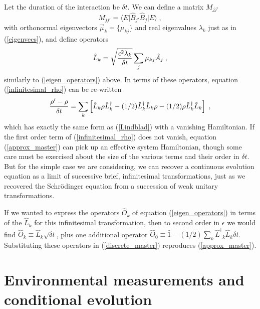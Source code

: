 \documentclass[12pt]{article}
\def\bra#1{{\langle #1 |}}
\def\ket#1{{| #1 \rangle}}
\def\id{{\hat 1}}
\def\O{{\hat O}}
\def\A{{\hat A}}
\def\B{{\hat B}}
\def\L{{\hat L}}
\def\Ldag{{\hat L^\dagger}}
\begin{document}
Let the duration of the interaction be $\delta t$.
We can define a matrix $M_{jj'}$
\begin{equation}
M_{jj'} = \bra{E}\B_{j'}\B_j\ket{E} \;,
\end{equation}
with orthonormal eigenvectors $\vec\mu_k = \{\mu_{kj}\}$ and real eigenvalues
$\lambda_k$ just as in (\ref{eigenvecs}), and define operators
\begin{equation}
\L_k = \sqrt{\epsilon^2\lambda_k\over\delta t} \sum_j \mu_{kj}\A_j \;,
\end{equation}
similarly to (\ref{eigen_operators}) above.
In terms of these operators, equation (\ref{infinitesimal_rho})
can be re-written
\begin{equation}
{{\rho'-\rho}\over \delta t} = \sum_k \left[
  \L_k \rho \Ldag_k - (1/2) \Ldag_k\L_k\rho - (1/2)\rho\Ldag_k\L_k
  \right] \;,
\label{approx_master}
\end{equation}
which has exactly the same form as (\ref{Lindblad}) with a vanishing
Hamiltonian.  If the first order term of (\ref{infinitesimal_rho})
does not vanish, equation (\ref{approx_master}) can pick up an effective
system Hamiltonian, though some care must be exercised about the size
of the various terms and their order in $\delta t$.  But for the simple
case we are considering, we can recover
a continuous evolution equation as a limit of successive brief,
infinitesimal transformations, just as we recovered the Schr\"odinger
equation from a succession of weak unitary transformations.

If we wanted to express the operators $\O_k$ of equation
(\ref{eigen_operators}) in terms of the $\L_k$ for
this infinitesimal transformation, then to second order in $\epsilon$
we would find $\O_k \equiv \L_k\sqrt{\delta t}$, plus one additional
operator $\O_0 \equiv \id - (1/2)\sum_k \Ldag_k\L_k \delta t$.
Substituting these operators in (\ref{discrete_master}) reproduces
(\ref{approx_master}).


\section{Environmental measurements and \\ conditional evolution}
\end{document}

